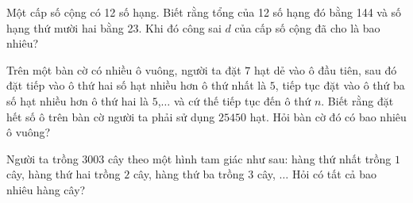 \begin{ex}%
	Một cấp số cộng có 12 số hạng. Biết rằng tổng của 12 số hạng đó bằng 144 và số hạng thứ mười hai bằng 23. Khi đó công sai $d$ của cấp số cộng đã cho là bao nhiêu?\par
\end{ex}

\begin{ex}%
	Trên một bàn cờ có nhiều ô vuông, người ta đặt $7$ hạt dẻ vào ô đầu tiên, sau đó đặt tiếp vào ô thứ hai số hạt nhiều hơn ô thứ nhất là $5$, tiếp tục đặt vào ô thứ ba số hạt nhiều hơn ô thứ hai là $5$,$\ldots$ và cứ thế tiếp tục đến ô thứ $n$. Biết rằng đặt hết số ô trên bàn cờ người ta phải sử dụng $25450$ hạt. Hỏi bàn cờ đó có bao nhiêu ô vuông?\par
\end{ex}

\begin{ex}%
	Người ta trồng $3003$ cây theo một hình tam giác như sau: hàng thứ nhất trồng $1$ cây, hàng thứ hai trồng $2$ cây, hàng thứ ba trồng $3$ cây, $\ldots$ Hỏi có tất cả bao nhiêu hàng cây?\par
\end{ex}

